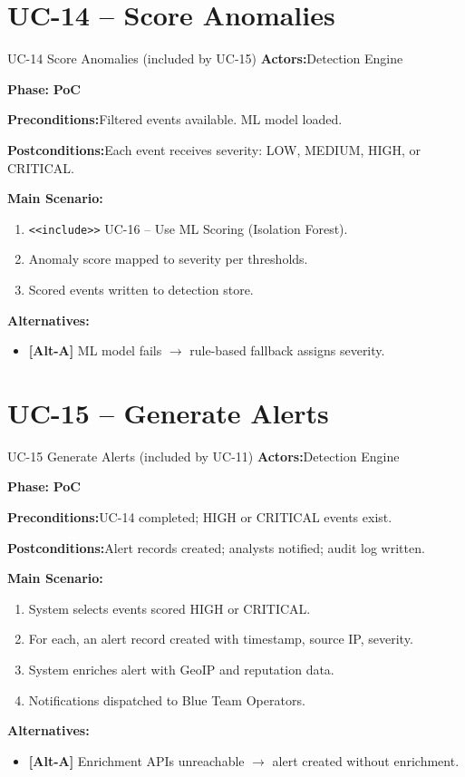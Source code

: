 \documentclass[12pt,a4paper]{report}
\newcommand{\ucfield}[2]{%
    \noindent\textbf{\color{helixpurplemid}#1:}\quad #2\par\medskip
}
\newcommand{\ucphase}[1]{%
    \noindent\textbf{\color{helixpurplemid}Phase:}\quad%
    \ifstrequal{#1}{PoC}{\textcolor{helixteal}{\textbf{PoC}}}{\textcolor{helixamber}{\textbf{Future MVP}}}%
    \par\medskip
}
\begin{document}
\section{UC-14 -- Score Anomalies}
\begin{ucbox}{UC-14 \quad Score Anomalies \textnormal{(included by UC-15)}}
    \ucfield{Actors}{Detection Engine}
    \ucphase{PoC}
    \ucfield{Preconditions}{Filtered events available. ML model loaded.}
    \ucfield{Postconditions}{Each event receives severity: LOW, MEDIUM, HIGH, or CRITICAL.}
    \textbf{\color{helixpurplemid}Main Scenario:}
    \begin{enumerate}
        \item \texttt{<<include>>} UC-16 -- Use ML Scoring (Isolation Forest).
        \item Anomaly score mapped to severity per thresholds.
        \item Scored events written to detection store.
    \end{enumerate}
    \textbf{\color{helixpurplemid}Alternatives:}
    \begin{itemize}
        \item \textbf{[Alt-A]} ML model fails $\rightarrow$ rule-based fallback assigns severity.
    \end{itemize}
\end{ucbox}

\section{UC-15 -- Generate Alerts}
\begin{ucbox}{UC-15 \quad Generate Alerts \textnormal{(included by UC-11)}}
    \ucfield{Actors}{Detection Engine}
    \ucphase{PoC}
    \ucfield{Preconditions}{UC-14 completed; HIGH or CRITICAL events exist.}
    \ucfield{Postconditions}{Alert records created; analysts notified; audit log written.}
    \textbf{\color{helixpurplemid}Main Scenario:}
    \begin{enumerate}
        \item System selects events scored HIGH or CRITICAL.
        \item For each, an alert record created with timestamp, source IP, severity.
        \item System enriches alert with GeoIP and reputation data.
        \item Notifications dispatched to Blue Team Operators.
    \end{enumerate}
    \textbf{\color{helixpurplemid}Alternatives:}
    \begin{itemize}
        \item \textbf{[Alt-A]} Enrichment APIs unreachable $\rightarrow$ alert created without enrichment.
    \end{itemize}
\end{ucbox}
\end{document}
